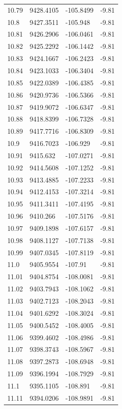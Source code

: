 \begin{table}[H]
\begin{tabular}{llll}
10.79 & 9428.4105 & -105.8499 & -9.81 \\
10.8 & 9427.3511 & -105.948 & -9.81 \\
10.81 & 9426.2906 & -106.0461 & -9.81 \\
10.82 & 9425.2292 & -106.1442 & -9.81 \\
10.83 & 9424.1667 & -106.2423 & -9.81 \\
10.84 & 9423.1033 & -106.3404 & -9.81 \\
10.85 & 9422.0389 & -106.4385 & -9.81 \\
10.86 & 9420.9736 & -106.5366 & -9.81 \\
10.87 & 9419.9072 & -106.6347 & -9.81 \\
10.88 & 9418.8399 & -106.7328 & -9.81 \\
10.89 & 9417.7716 & -106.8309 & -9.81 \\
10.9 & 9416.7023 & -106.929 & -9.81 \\
10.91 & 9415.632 & -107.0271 & -9.81 \\
10.92 & 9414.5608 & -107.1252 & -9.81 \\
10.93 & 9413.4885 & -107.2233 & -9.81 \\
10.94 & 9412.4153 & -107.3214 & -9.81 \\
10.95 & 9411.3411 & -107.4195 & -9.81 \\
10.96 & 9410.266 & -107.5176 & -9.81 \\
10.97 & 9409.1898 & -107.6157 & -9.81 \\
10.98 & 9408.1127 & -107.7138 & -9.81 \\
10.99 & 9407.0345 & -107.8119 & -9.81 \\
11.0 & 9405.9554 & -107.91 & -9.81 \\
11.01 & 9404.8754 & -108.0081 & -9.81 \\
11.02 & 9403.7943 & -108.1062 & -9.81 \\
11.03 & 9402.7123 & -108.2043 & -9.81 \\
11.04 & 9401.6292 & -108.3024 & -9.81 \\
11.05 & 9400.5452 & -108.4005 & -9.81 \\
11.06 & 9399.4602 & -108.4986 & -9.81 \\
11.07 & 9398.3743 & -108.5967 & -9.81 \\
11.08 & 9397.2873 & -108.6948 & -9.81 \\
11.09 & 9396.1994 & -108.7929 & -9.81 \\
11.1 & 9395.1105 & -108.891 & -9.81 \\
11.11 & 9394.0206 & -108.9891 & -9.81 \\

\end{tabular}
\end{table}
